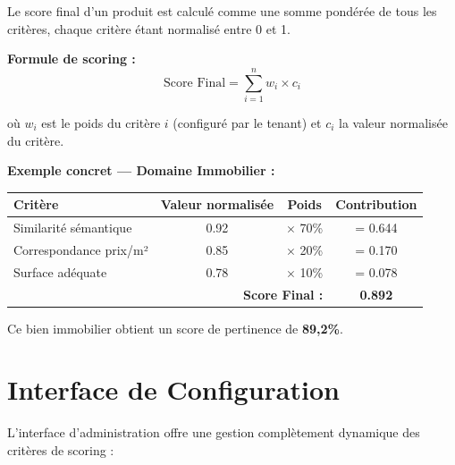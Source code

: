 \documentclass[11pt,a4paper]{report}
\begin{document}
Le score final d'un produit est calculé comme une somme pondérée de tous les critères, chaque critère étant normalisé entre 0 et 1.

\begin{processbox}
\textbf{Formule de scoring :}
$$\text{Score Final} = \sum_{i=1}^{n} w_i \times c_i$$

où $w_i$ est le poids du critère $i$ (configuré par le tenant) et $c_i$ la valeur normalisée du critère.

\vspace{0.5cm}

\textbf{Exemple concret --- Domaine Immobilier :}

\vspace{0.3cm}

\begin{tabular}{lccc}
\textbf{Critère} & \textbf{Valeur normalisée} & \textbf{Poids} & \textbf{Contribution} \\
\hline
Similarité sémantique & 0.92 & $\times$ 70\% & = 0.644 \\
Correspondance prix/m² & 0.85 & $\times$ 20\% & = 0.170 \\
Surface adéquate & 0.78 & $\times$ 10\% & = 0.078 \\
\hline
\multicolumn{3}{r}{\textbf{Score Final :}} & \textbf{0.892} \\
\end{tabular}

\vspace{0.3cm}
\textcolor{raasAccent}{\faStar} Ce bien immobilier obtient un score de pertinence de \textbf{89,2\%}.
\end{processbox}

\section{Interface de Configuration}

L'interface d'administration offre une gestion complètement dynamique des critères de scoring :
\end{document}
